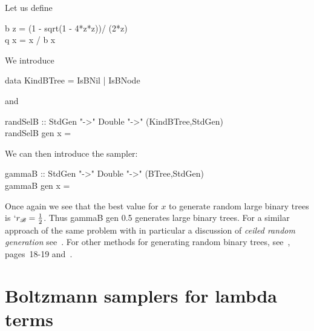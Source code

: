 \documentclass{sig-alternate}
\newcommand{\Bt}{\mathscr{B}}
\begin{document}
Let us define
\begin{haskell}
  b z = (1 - sqrt(1 - 4*z*z))/ (2*z)\\
 q x = x / b x
\end{haskell}
We introduce
\begin{haskell}
  data KindBTree = IsBNil | IsBNode
\end{haskell}
and
\begin{haskell}
\hspace*{-20pt}randSelB  :: StdGen "->"  Double "->" (KindBTree,StdGen)\\
\hspace*{-20pt}randSelB gen x = 
\end{haskell}
We can then introduce the sampler:
\begin{haskell}
\hspace*{-25pt} gammaB :: StdGen "->" Double "->" (BTree,StdGen)\\
\hspace*{-25pt} gammaB gen x = 
\qquad {}
\end{haskell}

Once again we see that the best value for $x$ to generate random large binary trees
is  $`r_{\Bt} = \frac{1}{2}$. Thus \<gammaB gen 0.5\> generates large
binary trees.  For a similar approach of the same problem with in particular a
discussion of \emph{ceiled random generation} see~\cite{yorgey13:_blog}.  For other
methods for generating random binary trees, see~\cite{KnuthVol4_4}, pages~18-19
and~\cite{DBLP:journals/ita/Remy85}.

\section{Boltzmann samplers for lambda terms}
\label{sec:lambda}
\end{document}
